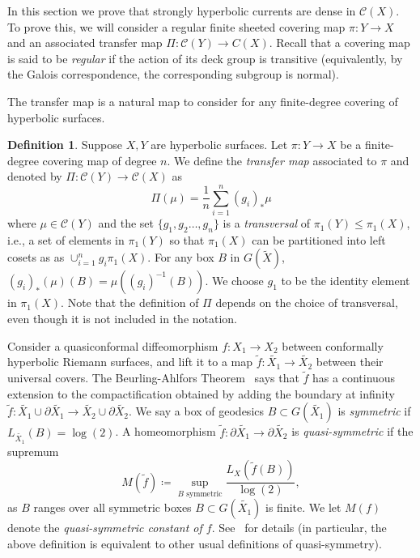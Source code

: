 \documentclass[12pt]{amsart}
\numberwithin{equation}{section}
\numberwithin{figure}{section}
\theoremstyle{definition}
\newtheorem{definition}[equation]{Definition}
\theoremstyle{plain}
\newcommand*{\wt}[1]{\widetilde{#1}}
\begin{document}
In this section we prove that strongly hyperbolic currents are dense in $\mathcal{C}(X)$. To prove this, we will consider a regular finite sheeted covering map $\pi \colon Y \to X$ and an associated transfer map $\Pi: \mathcal{C}(Y) \rightarrow C(X)$. Recall that a covering map is said to be \emph{regular} if the action of its deck group is transitive (equivalently, by the Galois correspondence, the corresponding subgroup is normal).

The transfer map is a natural map to consider for any finite-degree covering of hyperbolic surfaces.


\begin{definition}\label{def3.1}
Suppose $X, Y$ are hyperbolic surfaces.
Let $\pi \colon Y \to X$ be a finite-degree covering map of degree $n$. We define the \emph{transfer map} associated to $\pi$ and denoted by $\Pi: \mathcal{C}(Y) \rightarrow \mathcal{C}(X)$ as 
\[
\Pi(\mu) = \frac{1}{n} \sum_{i=1}^n (g_i)_* \mu
\]
where $\mu \in \mathcal{C}(Y)$ and the set $\{g_1, g_2 \dots, g_n\}$ is a \emph{transversal} of $\pi_1(Y) \leq \pi_1(X)$, i.e., a set of elements in $\pi_1(Y)$ so that $\pi_1(X)$ can be partitioned into left cosets as as $\cup_{i=1}^n g_i \pi_1(X)$. For any box $B$ in $G(\wt{X})$, $(g_i)_*(\mu)(B) = \mu((g_i)^{-1}(B))$. We choose $g_1$ to be the identity element in $\pi_1(X)$. Note that the definition of $\Pi$ depends on the choice of transversal, even though it is not included in the notation.
\end{definition}

Consider a quasiconformal diffeomorphism $f \colon X_1 \to X_2$ between conformally hyperbolic Riemann surfaces,
and lift it to a map $\wt{f} \colon \wt{X_1} \to \wt{X_2}$ between their universal covers.
The Beurling-Ahlfors Theorem~\cite[Corollary~4.9.4]{Hub08:Teich} says that $\wt{f}$ has a continuous extension to the compactification obtained by adding the boundary at infinity
$\wt{f} \colon \wt{X_1} \cup \partial \wt{X_1} \to \wt{X_2} \cup \partial \wt{X_2}$.
We say a box of geodesics $B \subset G(\wt{X_1})$ is \emph{symmetric} if $L_{\wt{X_1}}(B)=\log(2)$.
A homeomorphism $\wt{f} \colon \partial \wt{X_1} \to \partial \wt{X_2}$ is \emph{quasi-symmetric} if the supremum
\[
M(\wt{f}) \coloneqq \sup_{B \text{ symmetric}} \frac{L_{X}(\wt{f}(B))}{\log(2)},
\]
as $B$ ranges over all symmetric boxes $B \subset G(\wt{X_1})$ is finite. 
We let $M(f)$ denote the \emph{quasi-symmetric constant of $f$}. See~\cite[Section 3.3]{BS21:Infinite} for details (in particular, the above definition is equivalent to other usual definitions of quasi-symmetry).
\end{document}
